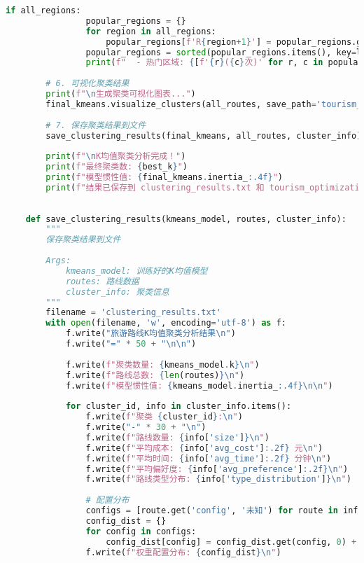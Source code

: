 \begin{lstlisting}[language=Python]
            if all_regions:
                popular_regions = {}
                for region in all_regions:
                    popular_regions[f'R{region+1}'] = popular_regions.get(f'R{region+1}', 0) + 1
                popular_regions = sorted(popular_regions.items(), key=lambda x: x[1], reverse=True)[:3]
                print(f"  - 热门区域: {[f'{r}({c}次)' for r, c in popular_regions]}")
        
        # 6. 可视化聚类结果
        print(f"\n生成聚类可视化图表...")
        final_kmeans.visualize_clusters(all_routes, save_path='tourism_optimization_clusters.png')
        
        # 7. 保存聚类结果到文件
        save_clustering_results(final_kmeans, all_routes, cluster_info)
        
        print(f"\nK均值聚类分析完成！")
        print(f"最终聚类数: {best_k}")
        print(f"模型惯性值: {final_kmeans.inertia_:.4f}")
        print(f"结果已保存到 clustering_results.txt 和 tourism_optimization_clusters.png")
    
    
    def save_clustering_results(kmeans_model, routes, cluster_info):
        """
        保存聚类结果到文件
        
        Args:
            kmeans_model: 训练好的K均值模型
            routes: 路线数据
            cluster_info: 聚类信息
        """
        filename = 'clustering_results.txt'
        with open(filename, 'w', encoding='utf-8') as f:
            f.write("旅游路线K均值聚类分析结果\n")
            f.write("=" * 50 + "\n\n")
            
            f.write(f"聚类数量: {kmeans_model.k}\n")
            f.write(f"路线总数: {len(routes)}\n")
            f.write(f"模型惯性值: {kmeans_model.inertia_:.4f}\n\n")
            
            for cluster_id, info in cluster_info.items():
                f.write(f"聚类 {cluster_id}:\n")
                f.write("-" * 30 + "\n")
                f.write(f"路线数量: {info['size']}\n")
                f.write(f"平均成本: {info['avg_cost']:.2f} 元\n")
                f.write(f"平均时间: {info['avg_time']:.2f} 分钟\n")
                f.write(f"平均偏好度: {info['avg_preference']:.2f}\n")
                f.write(f"路线类型分布: {info['type_distribution']}\n")
                
                # 配置分布
                configs = [route.get('config', '未知') for route in info['routes']]
                config_dist = {}
                for config in configs:
                    config_dist[config] = config_dist.get(config, 0) + 1
                f.write(f"权重配置分布: {config_dist}\n")
                

\end{lstlisting}
